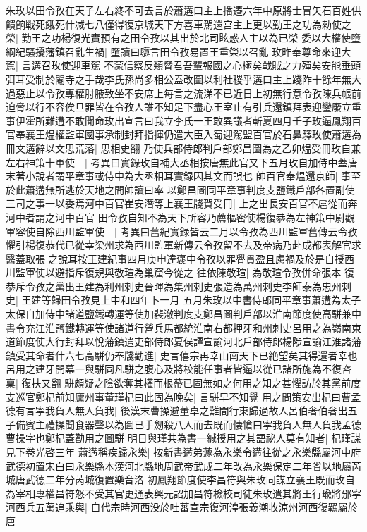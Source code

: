 朱玫以田令孜在天子左右終不可去言於蕭遘曰主上播遷六年中原將士冒矢石百姓供饋餉戰死餓死什减七八僅得復京城天下方喜車駕還宫主上更以勤王之功為勑使之榮|{
	勤王之功楊復光實預有之田令孜以其出於北司眩惑人主以為已榮}
委以大權使墮綱紀騷擾藩鎮召亂生禍|{
	墮讀曰隳言田令孜易置王重榮以召亂}
玫昨奉尊命來迎大駕|{
	言遘召玫使迎車駕}
不蒙信察反類脅君吾輩報國之心極矣戰賊之力殫矣安能垂頭弭耳受制於閹寺之手哉李氏孫尚多相公盍改圖以利社稷乎遘曰主上踐阼十餘年無大過惡止以令孜專權肘腋致坐不安席上每言之流涕不已近日上初無行意令孜陳兵帳前迫脅以行不容俟旦罪皆在令孜人誰不知足下盡心王室止有引兵還鎮拜表迎鑾廢立重事伊霍所難遘不敢聞命玫出宣言曰我立李氏一王敢異議者斬夏四月壬子玫逼鳳翔百官奉襄王煴權監軍國事承制封拜指揮仍遣大臣入蜀迎駕盟百官於石鼻驛玫使蕭遘為冊文遘辭以文思荒落|{
	思相史翻}
乃使兵部侍郎判戶部鄭昌圖為之乙卯煴受冊玫自兼左右神策十軍使　|{
	考異曰實錄玫自補大丞相按唐無此官又下五月玫自加侍中蓋唐末著小說者謂平章事或侍中為大丞相耳實録因其文而誤也}
帥百官奉煴還京師|{
	事至於此蕭遘無所逃於天地之間帥讀曰率}
以鄭昌圖同平章事判度支鹽鐵戶部各置副使三司之事一以委焉河中百官崔安潛等上襄王牋賀受冊|{
	上之出長安百官不扈從而奔河中者謂之河中百官}
田令孜自知不為天下所容乃薦樞密使楊復恭為左神策中尉觀軍容使自除西川監軍使　|{
	考異曰舊紀實録皆云二月以令孜為西川監軍舊傳云令孜懼引楊復恭代已從幸梁州求為西川監軍新傳云令孜留不去及帝病乃赴成都表解官求醫蓋取張之說耳按王建紀事四月庚申達褒中令孜以罪舋貫盈且慮禍及於是自授西川監軍使以避指斥復規與敬瑄為巢窟今從之}
往依陳敬瑄|{
	為敬瑄令孜併命張本}
復恭斥令孜之黨出王建為利州刺史晉暉為集州刺史張造為萬州刺史李師泰為忠州刺史|{
	王建等歸田令孜見上中和四年卜一月}
五月朱玫以中書侍郎同平章事蕭遘為太子太保自加侍中諸道鹽鐵轉運等使加裴澈判度支鄭昌圖判戶部以淮南節度使高駢兼中書令充江淮鹽鐵轉運等使諸道行營兵馬都統淮南右都押牙和州刺史呂用之為嶺南東道節度使大行封拜以悅藩鎮遣吏部侍郎夏侯譚宣諭河北戶部侍郎楊陟宣諭江淮諸藩鎮受其命者什六七高駢仍奉牋勸進|{
	史言僖宗再幸山南天下已絶望矣其得還者幸也}
呂用之建牙開幕一與駢同凡駢之腹心及將校能任事者皆逼以從已諸所施為不復咨稟|{
	復扶又翻}
駢頗疑之陰欲奪其權而根蔕已固無如之何用之知之甚懼訪於其黨前度支巡官鄭杞前知廬州事董瑾杞曰此固為晚矣|{
	言駢早不知覺}
用之問策安出杞曰曹孟德有言寜我負人無人負我|{
	後漢末曹操避董卓之難間行東歸過故人呂伯奢伯奢出五子備賓主禮操聞食器聲以為圖已手劒殺八人而去既而悽愴曰寜我負人無人負我孟德曹操字也鄭杞蓋勸用之圖駢}
明日與瑾共為書一緘授用之其語祕人莫有知者|{
	杞瑾謀見下卷光啓三年}
蕭遘稱疾歸永樂|{
	按新書遘弟蘧為永樂令遘往從之永樂縣屬河中府武德初置宋白曰永樂縣本漢河北縣地周武帝武成二年改為永樂保定二年省以地屬芮城唐武德二年分芮城復置樂音洛}
初鳳翔節度使李昌符與朱玫同謀立襄王既而玫自為宰相專權昌符怒不受其官更通表興元詔加昌符檢校司徒朱玫遣其將王行瑜將邠寜河西兵五萬追乘輿|{
	自代宗時河西没於吐蕃宣宗復河湟張義潮收涼州河西復羈屬於唐}
